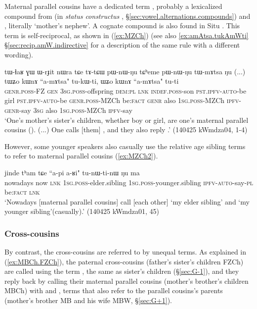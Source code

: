 Maternal parallel cousins have a dedicated term , probably a lexicalized compound from  (in \textit{status constructus} , §\ref{sec:vowel.alternations.compounds}) and , literally `mother's nephew'. A cognate compound is also found in Situ \citep{zhangsy20kinship}. This term is self-reciprocal, as shown in (\ref{ex:MZCh}) (see also \ref{ex:amAtsa.tukAmWti} §\ref{sec:recip.amW.indirective} for a description of the same rule with a different wording).

\begin{exe}
\ex \label{ex:MZCh}
\gll tɯ-ɬaʁ ɣɯ ɯ-rɟit nɯra tɕe tɤ-tɕɯ pɯ-nɯ-ŋu tɕʰeme pɯ-nɯ-ŋu tɯ-mɤtsa ŋu (...) tɯʑo kɯnɤ ``a-mɤtsa" tu-kɯ-ti, ɯʑo kɯnɤ ``a-mɤtsa" tu-ti \\
\textsc{genr}.\textsc{poss}-FZ \textsc{gen} \textsc{3sg}.\textsc{poss}-offspring \textsc{dem}:\textsc{pl} \textsc{lnk} \textsc{indef}.\textsc{poss}-son \textsc{pst}.\textsc{ipfv}-\textsc{auto}-be girl \textsc{pst}.\textsc{ipfv}-\textsc{auto}-be \textsc{genr}.\textsc{poss}-MZCh be:\textsc{fact} {  } \textsc{genr} also \textsc{1sg}.\textsc{poss}-MZCh \textsc{ipfv}-\textsc{genr}-say \textsc{3sg} also \textsc{1sg}.\textsc{poss}-MZCh \textsc{ipfv}-say \\
\glt `One's mother's sister's children, whether boy or girl, are one's maternal parallel cousins (). (...) One calls [them] , and they also reply .' (140425 kWmdza04, 1-4)
\end{exe}

However, some younger speakers also casually use the relative age sibling terms to refer to maternal parallel cousins (\ref{ex:MZCh2}). 

\begin{exe}
\ex \label{ex:MZCh2}
\gll jinde tʰam tɕe ``a-pi a-ʁi" tu-nɯ-ti-nɯ ŋu ma  \\
nowadays now \textsc{lnk} \textsc{1sg}.\textsc{poss}-elder.sibling \textsc{1sg}.\textsc{poss}-younger.sibling \textsc{ipfv}-\textsc{auto}-say-\textsc{pl} be:\textsc{fact} \textsc{lnk} \\
\glt `Nowadays [maternal parallel cousins] call [each other]  `my elder sibling' and   `my younger sibling'(casually).' (140425 kWmdza01, 45)
\end{exe}


\subsubsection{Cross-cousins} \label{sec:ego.cross.cousins}
By contrast, the cross-cousins are referred to by unequal terms. As explained in (\ref{ex:MBCh.FZCh}), the paternal cross-cousins (father's sister's children FZCh) are called using the term , the same as sister's children (§\ref{sec:G-1}), and they reply back by calling their maternal parallel cousins (mother's brother's children MBCh) with  and , terms that also refer to the parallel cousins's parents (mother's brother MB and his wife MBW, §\ref{sec:G+1}). 

